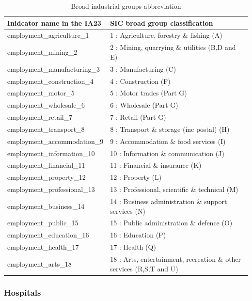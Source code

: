 \documentclass{article}
\begin{document}
\begin{table}[!h]

\caption{\label{tab:unnamed-chunk-3}Broad industrial groups abbreviation}
\centering
\begin{tabu} to 
\toprule
Inidcator name in the IA23 & SIC broad group classification\\
\midrule
employment\_agriculture\_1 & 1 : Agriculture, forestry \& fishing (A)\\
employment\_mining\_2 & 2 : Mining, quarrying \& utilities (B,D and E)\\
employment\_manufacturing\_3 & 3 : Manufacturing (C)\\
employment\_construction\_4 & 4 : Construction (F)\\
employment\_motor\_5 & 5 : Motor trades (Part G)\\
\addlinespace
employment\_wholesale\_6 & 6 : Wholesale (Part G)\\
employment\_retail\_7 & 7 : Retail (Part G)\\
employment\_transport\_8 & 8 : Transport \& storage (inc postal) (H)\\
employment\_accommodation\_9 & 9 : Accommodation \& food services (I)\\
employment\_information\_10 & 10 : Information \& communication (J)\\
\addlinespace
employment\_financial\_11 & 11 : Financial \& insurance (K)\\
employment\_property\_12 & 12 : Property (L)\\
employment\_professional\_13 & 13 : Professional, scientific \& technical (M)\\
employment\_business\_14 & 14 : Business administration \& support services (N)\\
employment\_public\_15 & 15 : Public administration \& defence (O)\\
\addlinespace
employment\_education\_16 & 16 : Education (P)\\
employment\_health\_17 & 17 : Health (Q)\\
employment\_arts\_18 & 18 : Arts, entertainment, recreation \& other services (R,S,T and U)\\
\bottomrule
\end{tabu}
\end{table}

\hypertarget{hospitals}{%
\subsubsection{Hospitals}\label{hospitals}}
\end{document}
